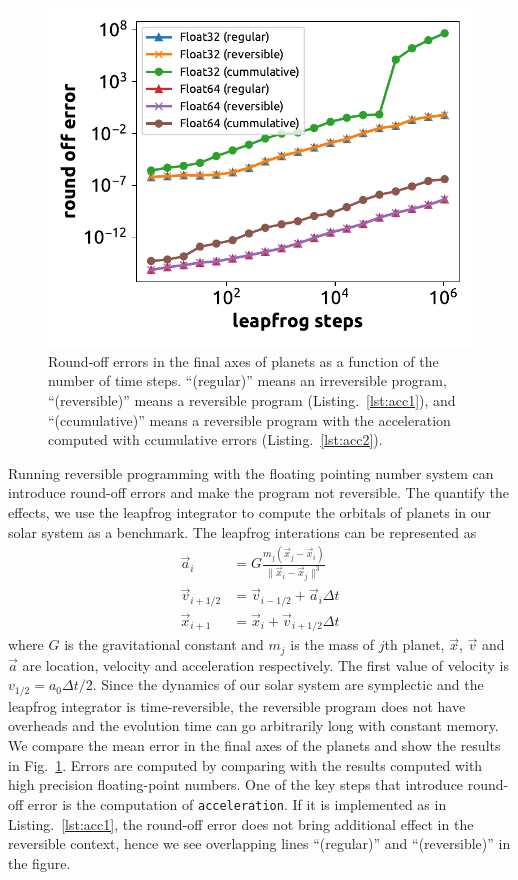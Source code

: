 \documentclass{article}
\newcommand{\<}{\langle}
\renewcommand{\>}{\rangle}
\newcommand{\Fig}[1]{Fig.~\ref{#1}}
\newcommand{\Lst}[1]{Listing.~\ref{#1}}
\theoremstyle{definition}\newtheorem{definition}{\textit{Definition}}
\begin{document}
\begin{figure}
    \centerline{\includegraphics[width=0.5\columnwidth,trim={0 0cm 0 0},clip]{fig11.pdf}}
    \caption{Round-off errors in the final axes of planets as a function of the number of time steps. ``(regular)'' means an irreversible program, ``(reversible)'' means a reversible program (\Lst{lst:acc1}), and ``(ccumulative)'' means a reversible program with the acceleration computed with ccumulative errors (\Lst{lst:acc2}).}\label{fig:leapfrog}
\end{figure}
Running reversible programming with the floating pointing number system can introduce round-off errors and make the program not reversible. The quantify the effects, we use the leapfrog integrator to compute the orbitals of planets in our solar system as a benchmark. The leapfrog interations can be represented as
\begin{align}
    \vec a_i &= G\frac{m_j (\vec x_j-\vec x_i)}{\|\vec x_i - \vec x_j\|^3}\\
    \vec v_{i+1/2} &= \vec v_{i-1/2} + \vec a_{i} \Delta t\\
    \vec x_{i+1} &= \vec x_i + \vec v_{i+1/2}\Delta t
\end{align}
where $G$ is the gravitational constant and $m_j$ is the mass of $j$th planet, $\vec x$, $\vec v$ and $\vec a$ are location, velocity and acceleration respectively. The first value of velocity is $v_{1/2} = a_0 \Delta t/2$.
Since the dynamics of our solar system are symplectic and the leapfrog integrator is time-reversible, the reversible program does not have overheads and the evolution time can go arbitrarily long with constant memory.
We compare the mean error in the final axes of the planets and show the results in \Fig{fig:leapfrog}.
Errors are computed by comparing with the results computed with high precision floating-point numbers.
One of the key steps that introduce round-off error is the computation of \texttt{acceleration}. If it is implemented as in \Lst{lst:acc1}, the round-off error does not bring additional effect in the reversible context, hence we see overlapping lines ``(regular)'' and ``(reversible)'' in the figure.
\end{document}
